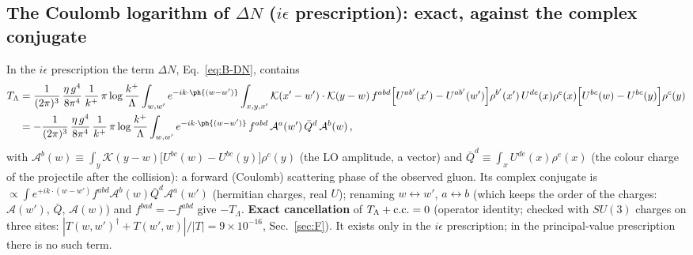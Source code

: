 \subsection{The Coulomb logarithm of $\Delta N$ ($i\epsilon$ prescription): exact, against the complex conjugate}\label{sec:C7}
In the $i\epsilon$ prescription the term $\Delta N$, Eq.~\eqref{eq:B-DN}, contains
\begingroup\color{gray}
\begin{align}
T_{\Lambda}&=\frac{1}{(2\pi)^{3}}\,\frac{\eta\,g^{4}}{8\pi^{4}}\,\frac{1}{k^{+}}\,\pi\log\frac{k^{+}}{\Lambda}\int_{w,w'}e^{-ik\cdot\ph{(w-w')}}\int_{x,y,x'}\mathcal{K}(x'-w')\cdot\mathcal{K}(y-w)\,f^{abd}\Big[U^{ab'}(x')-U^{ab'}(w')\Big]\rho^{b'}(x')\,U^{de}(x)\rho^{e}(x)\Big[U^{bc}(w)-U^{bc}(y)\Big]\rho^{c}(y)\notag\\
&=-\frac{1}{(2\pi)^{3}}\,\frac{\eta\,g^{4}}{8\pi^{4}}\,\frac{1}{k^{+}}\,\pi\log\frac{k^{+}}{\Lambda}\int_{w,w'}e^{-ik\cdot\ph{(w-w')}}\,f^{abd}\,\mathcal{A}^{a}(w')\,\bar{Q}^{d}\,\mathcal{A}^{b}(w)\,,\label{eq:C-Coul}
\end{align}
\endgroup
with $\mathcal{A}^{b}(w)\equiv\int_{y}\mathcal{K}(y-w)\big[U^{bc}(w)-U^{bc}(y)\big]\rho^{c}(y)$ (the LO amplitude, a vector) and $\bar{Q}^{d}\equiv\int_{x}U^{de}(x)\rho^{e}(x)$ (the colour charge of the projectile after the collision): a forward (Coulomb) scattering phase of the observed gluon. Its complex conjugate is $\propto\int e^{+ik\cdot(w-w')}f^{abd}\mathcal{A}^{b}(w)\bar{Q}^{d}\mathcal{A}^{a}(w')$ (hermitian charges, real $U$); renaming $w\leftrightarrow w'$, $a\leftrightarrow b$ (which keeps the order of the charges: $\mathcal{A}(w')$, $\bar{Q}$, $\mathcal{A}(w)$) and $f^{bad}=-f^{abd}$ give $-T_{\Lambda}$. \textbf{Exact cancellation} of {\color{gray}$T_{\Lambda}+{\rm c.c.}=0$} (operator identity; checked with $SU(3)$ charges on three sites: $|T(w,w')^{\dagger}+T(w',w)|/|T|=9\times10^{-16}$, Sec.~\ref{sec:F}). It exists only in the $i\epsilon$ prescription; in the principal-value prescription there is no such term.
